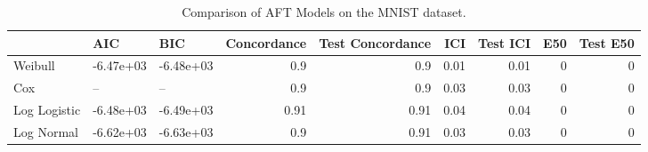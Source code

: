 \begin{table*}
\centering
\caption{Comparison of AFT Models on the MNIST dataset.}
\label{tab:mnist}
\begin{tabular}{lllrrrrrr}
\toprule
 & AIC & BIC & Concordance & Test Concordance & ICI & Test ICI & E50 & Test E50 \\
\midrule
Weibull & -6.47e+03 & -6.48e+03 & 0.9 & 0.9 & 0.01 & 0.01 & 0 & 0 \\
Cox & -- & -- & 0.9 & 0.9 & 0.03 & 0.03 & 0 & 0 \\
Log Logistic & -6.48e+03 & -6.49e+03 & 0.91 & 0.91 & 0.04 & 0.04 & 0 & 0 \\
Log Normal & -6.62e+03 & -6.63e+03 & 0.9 & 0.91 & 0.03 & 0.03 & 0 & 0 \\
\bottomrule
\end{tabular}
\end{table*}
